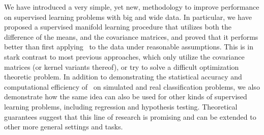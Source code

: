 \documentclass[10pt]{article}
\begin{document}
We have introduced a very simple, yet new, methodology to improve performance on supervised learning problems with big and wide data.  In particular, we have proposed a supervised manifold learning procedure that utilizes both the difference of the means, and the covariance matrices, and proved that it performs better than first applying \Pca~to the data under reasonable assumptions.  This is in stark contrast to most previous approaches, which only utilize the covariance matrices (or kernel variants thereof), or try to solve a difficult optimization theoretic problem.  In addition to demonstrating the statistical accuracy and computational efficiency of \Lol~on simulated and real classification problems, we also demonstrate how the same idea can also be used for other kinds of supervised learning problems, including regression and hypothesis testing. Theoretical guarantees suggest that this line of research is promising and can be extended to other more general settings and tasks.



\end{document}
